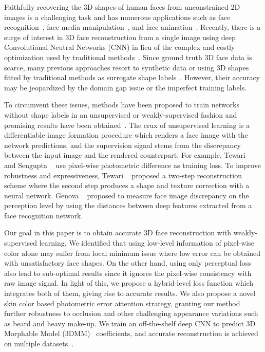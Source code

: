 \documentclass[10pt,twocolumn,letterpaper]{article}
\begin{document}
Faithfully recovering the 3D shapes of human faces from unconstrained 2D images is a challenging task and has numerous applications such as face recognition~\cite{blanz2003face,tran2017regressing,zulqarnain2018learning}, face media manipulation~\cite{blanz1999morphable,thies2016face2face}, and face animation~\cite{cao20133d,hu2017avatar}. 
Recently, there is a surge of interest in 3D face reconstruction from a single image using deep Convolutional Neutral Networks (CNN) in lieu of the complex and costly optimization used by traditional methods~\cite{richardson20163d,dou2017end,richardson2017learning,tran2017regressing,jackson2017large,sela2017unrestricted,tewari2017mofa,tewari2018self,tran2018nonlinear,sengupta2018sfsnet,feng2018joint,guo2018cnn}. Since ground truth 3D face data is scarce, many previous approaches resort to synthetic data or using 3D shapes fitted by traditional methods as surrogate shape labels~\cite{richardson20163d,zhu2016face,sela2017unrestricted,liu2018disentangling,feng2018joint,guo2018cnn}. However, their accuracy may be jeopardized by the domain gap issue or the imperfect training labels.

To circumvent these issues, methods have been proposed to train networks without shape labels in an unsupervised or weakly-supervised fashion and promising results have been obtained~\cite{tewari2017mofa,tewari2018self,tran2018nonlinear,sengupta2018sfsnet,genova2018unsupervised}. The crux of unsupervised learning is a differentiable image formation procedure which renders a face image with the network predictions, and the supervision signal stems from the discrepancy between the input image and the rendered counterpart. For example, Tewari \etal~\cite{tewari2017mofa} and Sengupta \etal~\cite{sengupta2018sfsnet} use pixel-wise photometric difference as training loss.
To improve robustness and expressiveness, Tewari \etal~\cite{tewari2018self} proposed a two-step reconstruction scheme where the second step produces a shape and texture correction with a neural network. Genova \etal~\cite{genova2018unsupervised} proposed to measure face image discrepancy on the perception level by using the distances between deep features extracted from a face recognition network.

Our goal in this paper is to obtain accurate 3D face reconstruction with weakly-supervised learning. We identified that using low-level information of pixel-wise color alone may suffer from local minimum issue where low error can be obtained with unsatisfactory face shapes. 
On the other hand, using only perceptual loss also lead to sub-optimal results since it ignores the pixel-wise consistency with raw image signal. In light of this, we propose a hybrid-level loss function which integrates both of them, giving rise to accurate results. We also propose a novel skin color based photometric error attention strategy, granting our method further robustness to occlusion and other challenging appearance variations such as beard and heavy make-up.
We train an off-the-shelf deep CNN to predict 3D Morphable Model (3DMM)~\cite{blanz1999morphable} coefficients, and accurate reconstruction is achieved on multiple datasets~\cite{bagdanov2011florence,cao2014facewarehouse,yin20063d}.
\end{document}
